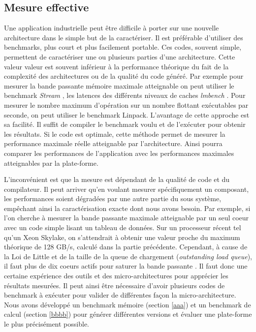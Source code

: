 \subsection{Mesure effective}
Une application industrielle peut être difficile à porter sur une nouvelle architecture dans le simple but de la caractériser. Il est préférable d'utiliser des benchmarks, plus court et plus facilement portable. Ces codes, souvent simple, permettent de caractériser une ou plusieurs parties d'une architecture. Cette valeur valeur est souvent inférieur à la performance théorique du fait de la complexité des architectures ou de la qualité du code généré. Par exemple pour mesurer la bande passante mémoire maximale atteignable on peut utiliser le benchmark \textit{Stream} \cite{McCalpin1995}, les latences des différents niveaux de caches \textit{lmbench} \cite{Staelin2002}. Pour mesurer le nombre maximum d'opération sur un nombre flottant exécutables par seconde, on peut utiliser le benchmark Linpack. 
L'avantage de cette approche est sa facilité. Il suffit de compiler le benchmark voulu et de l'exécuter pour obtenir les résultats. Si le code est optimale, cette méthode permet de mesurer la performance maximale réelle atteignable par l'architecture. Ainsi pourra comparer les performances de l'application avec les performances maximales atteignables par la plate-forme. 

L'inconvénient est que la mesure est dépendant de la qualité de code et du compilateur. Il peut arriver qu'en voulant mesurer spécifiquement un composant, les performances soient dégradées par une autre partie du sous système, empêchant ainsi la caractérisation exacte dont nous avons besoin. Par exemple, si l'on cherche à mesurer la bande passante maximale atteignable par un seul coeur avec un code simple lisant un tableau de données. Sur un processeur récent tel qu'un Xeon Skylake, on s'attendrait à obtenir une valeur proche du maximum théorique de 128 GB/s, calculé dans la partie précédente. Cependant, à cause de la Loi de Little \cite{little2008little} et de la taille de la queue de chargement (\textit{outstanding load queue}), il faut plus de dix coeurs actifs pour saturer la bande passante \cite{JohnMcCalpin2010}. Il faut donc une certaine expérience des outils et des micro-architectures pour apprécier les résultats mesurées. Il peut ainsi être nécessaire d'avoir plusieurs codes de benchmark à exécuter pour valider de différentes façon la micro-architecture. Nous avons développé un benchmark mémoire (section \ref{aaa}) et un benchmark de calcul (section \ref{bbbb}) pour générer différentes versions et évaluer une plate-forme le plus précisément possible.





